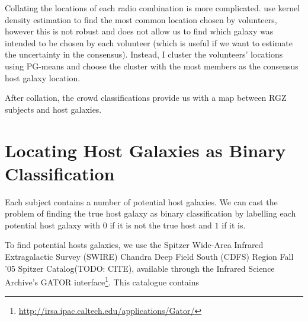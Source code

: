 \documentclass[a4paper]{article}
\begin{document}
        Collating the locations of each radio combination is more complicated. \citet{banfield15} use kernel density estimation to find the most common location chosen by volunteers, however this is not robust and does not allow us to find which galaxy was intended to be chosen by each volunteer (which is useful if we want to estimate the uncertainty in the consensus). Instead, I cluster the volunteers' locations using PG-means\citep{hamerly07} and choose the cluster with the most members as the consensus host galaxy location.

        After collation, the crowd classifications provide us with a map between RGZ subjects and host galaxies.

    \section{Locating Host Galaxies as Binary Classification}

        Each subject contains a number of potential host galaxies. We can cast the problem of finding the true host galaxy as binary classification by labelling each potential host galaxy with $0$ if it is not the true host and $1$ if it is.

        To find potential hosts galaxies, we use the Spitzer Wide-Area Infrared Extragalactic Survey (SWIRE) Chandra Deep Field South (CDFS) Region Fall '05 Spitzer Catalog(TODO: CITE), available through the Infrared Science Archive's GATOR interface\footnote{\url{http://irsa.ipac.caltech.edu/applications/Gator/}}. This catalogue contains 

    
    
\end{document}
